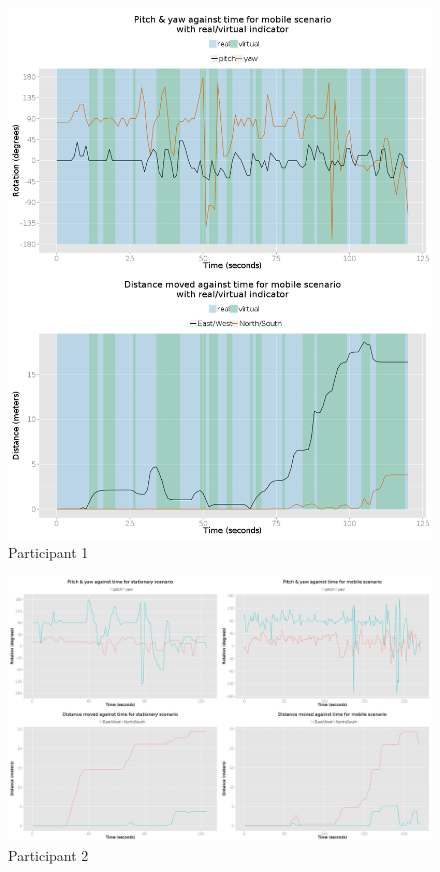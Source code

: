 \documentclass[oneside]{book}
\begin{document}
\begin{figure}[h]
	\begin{center}
		\includegraphics[width=\linewidth]{images/24072014_1200_2up.png}
		\caption{Participant 1}
		\label{participant_1_2up}
	\end{center}
\end{figure}


\begin{landscape}
	\begin{figure}[h]
		\begin{center}
			\includegraphics[width=\linewidth]{images/25072014_1300_4up.png}
			\caption{Participant 2}
			\label{participant_2_4up}
		\end{center}
	\end{figure}
\end{landscape}
\end{document}
